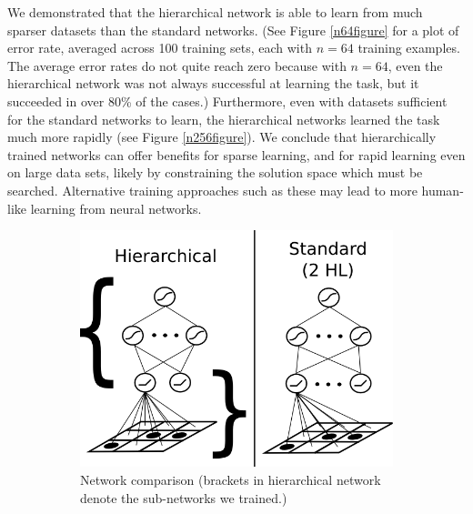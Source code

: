 \documentclass[10pt]{article}
\begin{document}
{We demonstrated that the hierarchical network is able to learn from much sparser datasets than the standard networks. (See Figure \ref{n64figure} for a plot of error rate, averaged across 100 training sets, each with $n = 64$ training examples. The average error rates do not quite reach zero because with $n = 64$, even the hierarchical network was not always successful at learning the task, but it succeeded in over 80\% of the cases.) Furthermore, even with datasets sufficient for the standard networks to learn, the hierarchical networks learned the task much more rapidly (see Figure \ref{n256figure}). We conclude that hierarchically trained networks can offer benefits for sparse learning, and for rapid learning even on large data sets, likely by constraining the solution space which must be searched. Alternative training approaches such as these may lead to more human-like learning from neural networks.
\begin{figure}[H]
    \centering
    \begin{subfigure}[c]{0.35\textwidth}
	\centering
	\includegraphics[width=\textwidth]{figures/hierarchical_NN_abstract_figure.png}
	\caption{Network comparison (brackets in hierarchical network denote the sub-networks we trained.)}
	\label{networkdiagram}
    \end{subfigure}
    \begin{subfigure}[c]{0.3\textwidth}
	\centering

\end{subfigure}
\end{figure}}
\end{document}
